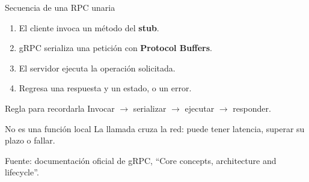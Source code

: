 \begin{frame}{Secuencia de una RPC unaria}
  \begin{enumerate}
    \item El cliente invoca un método del \textbf{stub}.
    \item gRPC serializa una petición con \textbf{Protocol Buffers}.
    \item El servidor ejecuta la operación solicitada.
    \item Regresa una respuesta y un estado, o un error.
  \end{enumerate}
  \begin{block}{Regla para recordarla}
    Invocar $\rightarrow$ serializar $\rightarrow$ ejecutar $\rightarrow$ responder.
  \end{block}
  \begin{alertblock}{No es una función local}
    La llamada cruza la red: puede tener latencia, superar su plazo o fallar.
  \end{alertblock}
  \vfill
  {\tiny Fuente: documentación oficial de gRPC, ``Core concepts, architecture
  and lifecycle''.}
\end{frame}
